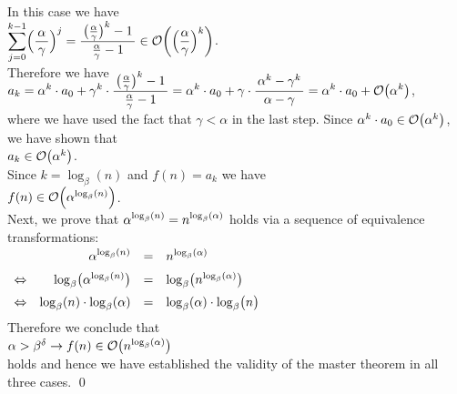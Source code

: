 \begin{enumerate}
      In this case we have
      \\[0.2cm]
      \hspace*{1.3cm}
      $\ds\sum\limits_{j=0}^{k-1} \Bigl(\frac{\,\alpha\,}{\gamma}\Bigr)^j = \bruch{\bigl(\frac{\alpha}{\gamma}\bigr)^k - 1}{\frac{\alpha}{\gamma} - 1} \in \Oh\biggl(\Bigl(\frac{\alpha}{\gamma}\Bigr)^k\biggr)$.
      \\[0.2cm]
      Therefore we have
      \\[0.2cm]
      \hspace*{1.3cm}
      $\ds a_k = \alpha^k\cdot a_0 + \gamma^k \cdot \bruch{\bigl(\frac{\alpha}{\gamma}\bigr)^k - 1}{\frac{\alpha}{\gamma} - 1} =
                   \alpha^k\cdot a_0 + \gamma \cdot \bruch{\alpha^k -\gamma^k}{\alpha - \gamma} =
                   \alpha^k\cdot a_0 + \Oh\bigl(\alpha^k\bigr)
      $,
      \\[0.2cm] 
      where we have used the fact that $\gamma < \alpha$ in the last step.
      Since $\alpha^k \cdot a_0 \in \mathcal{O}\bigl(\alpha^k\bigr)$, we have shown that
      \\[0.2cm]
      \hspace*{1.3cm}
      $a_k \in  \mathcal{O}\bigl(\alpha^k\bigr)$.
      \\[0.2cm]
      Since  $k = \log_{\beta}(n)$ and $f(n) = a_k$ we have
      \\[0.2cm]
      \hspace*{1.3cm}
      $f(n) \in \mathcal{O}\Bigl(\alpha^{\log_{\beta}(n)}\Bigr)$.
      \\[0.2cm] 
      Next, we prove that $\displaystyle\alpha^{\log_{\beta}(n)} = n^{\log_{\beta}(\alpha)}$ holds via a sequence of
      equivalence transformations:
      \\[0.2cm]
      \hspace*{1.3cm}
      $
      \begin{array}[t]{lrcl}
                        & \displaystyle\alpha^{\log_{\beta}(n)} & = & n^{\log_{\beta}(\alpha)} \\[0.2cm]
        \Leftrightarrow & \log_\beta\bigl(\alpha^{\log_{\beta}(n)}\bigr) & = & \log_{\beta}\bigl(n^{\log_{\beta}(\alpha)}\bigr) \\[0.2cm]
        \Leftrightarrow & \log_{\beta}(n) \cdot \log_\beta(\alpha) & = & \log_{\beta}(\alpha) \cdot \log_{\beta}\bigl(n\bigr) \\[0.2cm]      
      \end{array}
      $
      \\[0.2cm]
      Therefore we conclude that
      \\[0.2cm]
      \hspace*{1.3cm}
      $\alpha > \beta^\delta \rightarrow f(n) \in \mathcal{O}\bigl(n^{\log_{\beta}(\alpha)}\bigr)$
      \\[0.2cm]
      holds and hence we have established the validity of the master theorem in all three cases.  
      \qed
\end{enumerate}

